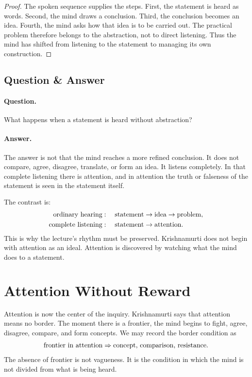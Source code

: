\begin{proof}
The spoken sequence supplies the steps. First, the statement is heard as words. Second, the mind draws a conclusion. Third, the conclusion becomes an idea. Fourth, the mind asks how that idea is to be carried out. The practical problem therefore belongs to the abstraction, not to direct listening. Thus the mind has shifted from listening to the statement to managing its own construction.
\end{proof}

\subsection{Question \& Answer}

\paragraph{Question.}
What happens when a statement is heard without abstraction?

\paragraph{Answer.}
The answer is not that the mind reaches a more refined conclusion. It does not compare, agree, disagree, translate, or form an idea. It listens completely. In that complete listening there is attention, and in attention the truth or falseness of the statement is seen in the statement itself.

The contrast is:
\begin{align}
\hbox{ordinary hearing}
&:\quad
\hbox{statement}\to\hbox{idea}\to\hbox{problem},\\
\hbox{complete listening}
&:\quad
\hbox{statement}\to\hbox{attention}.
\end{align}
This is why the lecture's rhythm must be preserved. Krishnamurti does not begin with attention as an ideal. Attention is discovered by watching what the mind does to a statement.

\section{Attention Without Reward}

Attention is now the center of the inquiry. Krishnamurti says that attention means no border. The moment there is a frontier, the mind begins to fight, agree, disagree, compare, and form concepts. We may record the border condition as
\begin{equation}
\hbox{frontier in attention}
\Rightarrow
\hbox{concept, comparison, resistance}.
\end{equation}
The absence of frontier is not vagueness. It is the condition in which the mind is not divided from what is being heard.

